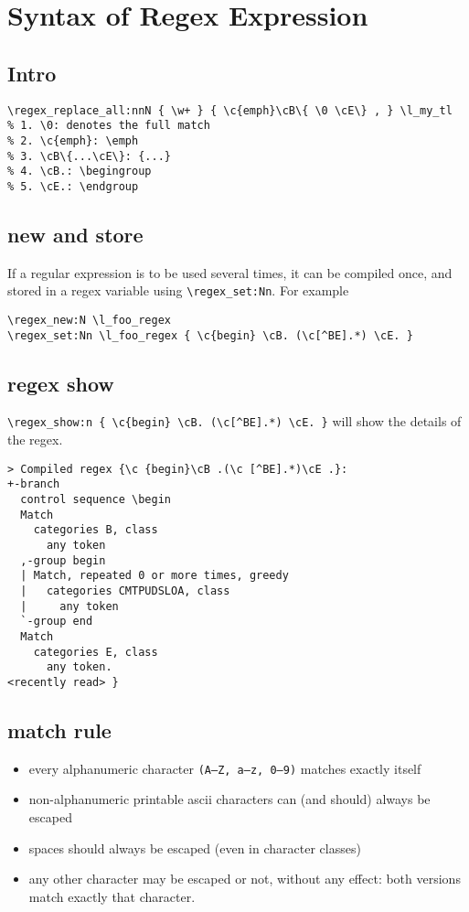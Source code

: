 \documentclass{article}
\begin{document}
\tableofcontents
\newpage

\section{Syntax of Regex Expression}
\subsection{Intro}
\begin{verbatim}
\regex_replace_all:nnN { \w+ } { \c{emph}\cB\{ \0 \cE\} , } \l_my_tl
% 1. \0: denotes the full match
% 2. \c{emph}: \emph
% 3. \cB\{...\cE\}: {...}
% 4. \cB.: \begingroup 
% 5. \cE.: \endgroup
\end{verbatim}

\subsection{new and store}
If a regular expression is to be used several times, it can be compiled once, and
stored in a regex variable using \verb|\regex_set:Nn|. For example
\begin{verbatim}
\regex_new:N \l_foo_regex
\regex_set:Nn \l_foo_regex { \c{begin} \cB. (\c[^BE].*) \cE. }
\end{verbatim}

\subsection{regex show}
\verb|\regex_show:n { \c{begin} \cB. (\c[^BE].*) \cE. }| will show the details of the regex.
\begin{verbatim}
> Compiled regex {\c {begin}\cB .(\c [^BE].*)\cE .}:
+-branch
  control sequence \begin
  Match
    categories B, class
      any token
  ,-group begin
  | Match, repeated 0 or more times, greedy
  |   categories CMTPUDSLOA, class
  |     any token
  `-group end
  Match
    categories E, class
      any token.
<recently read> }
\end{verbatim}

\subsection{match rule}
\begin{itemize}
  \item every alphanumeric character \verb|(A–Z, a–z, 0–9)| matches exactly itself
  \item non-alphanumeric printable ascii characters can (and should) always be escaped
  \item spaces should always be escaped (even in character classes)
  \item any other character may be escaped or not, without any effect: both versions match
    exactly that character.
\end{itemize}
\end{document}
